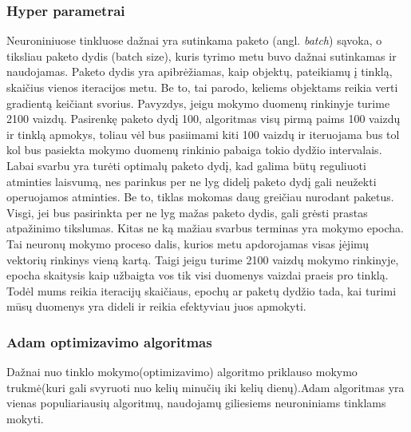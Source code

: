 \documentclass{VUMIFPSkursinis}
\DeclareRobustCommand{\[}{\begin{equation}}
\DeclareRobustCommand{\]}{\end{equation}}
\begin{document}
\subsubsection{Hyper parametrai}
Neuroniniuose tinkluose dažnai yra sutinkama paketo (angl. \textit{batch}) sąvoka, o tiksliau paketo dydis (batch size), kuris tyrimo metu buvo dažnai sutinkamas ir naudojamas. Paketo dydis yra apibrėžiamas, kaip objektų, pateikiamų į tinklą, skaičius vienos	iteracijos metu. Be to, tai	parodo, keliems	objektams reikia verti gradientą keičiant svorius. Pavyzdys, jeigu mokymo duomenų rinkinyje turime 2100 vaizdų. Pasirenkę paketo dydį 100, algoritmas visų pirmą paims 100 vaizdų ir tinklą apmokys, toliau vėl bus pasiimami kiti 100 vaizdų ir iteruojama bus tol kol bus pasiekta mokymo duomenų rinkinio pabaiga tokio dydžio intervalais. Labai svarbu yra turėti optimalų paketo dydį, kad galima būtų reguliuoti atminties laisvumą, nes parinkus per ne lyg didelį paketo dydį gali neužekti operuojamos atminties. Be to, tiklas mokomas daug greičiau nurodant paketus. Visgi, jei bus pasirinkta per ne lyg mažas paketo dydis, gali grėsti prastas atpažinimo tikslumas.
Kitas ne ką mažiau svarbus terminas yra  mokymo epocha. Tai neuronų mokymo proceso dalis, kurios metu apdorojamas visas įėjimų vektorių rinkinys vieną kartą. Taigi jeigu turime 2100 vaizdų mokymo rinkinyje, epocha skaitysis kaip užbaigta vos tik visi duomenys vaizdai praeis pro tinklą.	
Todėl mums reikia iteracijų skaičiaus, epochų ar paketų dydžio tada, kai turimi mūsų duomenys yra dideli ir reikia efektyviau juos apmokyti.

\subsubsection{Adam optimizavimo algoritmas}
Dažnai nuo tinklo mokymo(optimizavimo) algoritmo priklauso mokymo trukmė(kuri gali svyruoti nuo kelių minučių iki kelių dienų).Adam algoritmas yra vienas populiariausių algoritmų, naudojamų giliesiems neuroniniams tinklams mokyti.
\pagebreak
\end{document}
